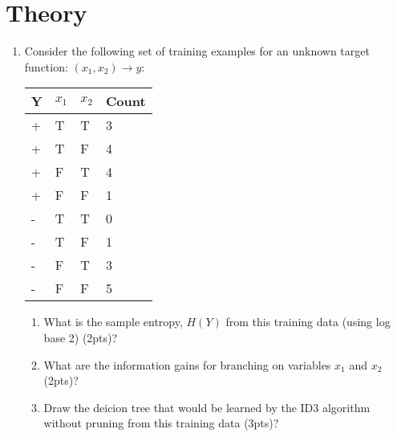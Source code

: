 \documentclass[12pt]{article}
\begin{document}
\section{Theory}
\begin{enumerate}
\item Consider the following set of training examples for an unknown target function:  $(x_1, x_2)\rightarrow y$:
\begin{table}[h]
\begin{center}
\begin{tabular}{|l|l|l|l|}
\hline
Y & $x_1$ & $x_2$ & Count\\
\hline
+ & T & T & 3\\
+ & T & F & 4\\
+ & F & T & 4\\
+ & F & F & 1\\
- & T & T & 0\\
- & T & F & 1\\
- & F & T & 3\\
- & F & F & 5\\
\hline
\end{tabular}
\end{center}
\end{table}
	\begin{enumerate}
	\item What is the sample entropy, $H(Y)$ from this training data (using log base 2) (2pts)?
	\item What are the information gains for branching on variables $x_1$ and $x_2$ (2pts)?
	\item Draw the deicion tree that would be learned by the ID3 algorithm without pruning from this training data (3pts)?
	\end{enumerate}
	

\end{enumerate}
\end{document}
